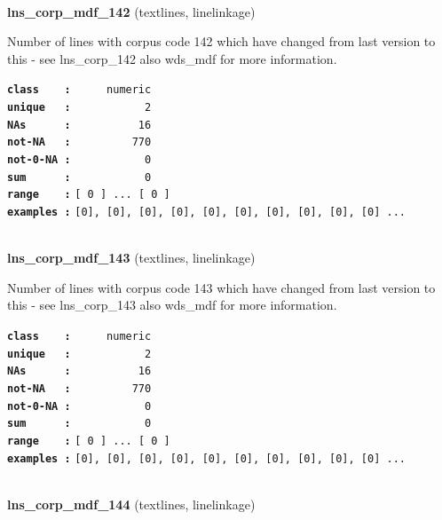 \documentclass[]{article}
\begin{document}
~

\textbf{lns\_corp\_mdf\_142} (textlines, linelinkage)

Number of lines with corpus code 142 which have changed from last
version to this - see lns\_corp\_142 also wds\_mdf for more information.

\textbf{\texttt{class\ \ \ \ :}} \texttt{~~~~~numeric}\\
\textbf{\texttt{unique\ \ \ :}} \texttt{~~~~~~~~~~~2}\\
\textbf{\texttt{NAs\ \ \ \ \ \ :}} \texttt{~~~~~~~~~~16}\\
\textbf{\texttt{not-NA\ \ \ :}} \texttt{~~~~~~~~~770}\\
\textbf{\texttt{not-0-NA\ :}} \texttt{~~~~~~~~~~~0}\\
\textbf{\texttt{sum\ \ \ \ \ \ :}} \texttt{~~~~~~~~~~~0}\\
\textbf{\texttt{range\ \ \ \ :}}
\texttt{{[}\ 0\ {]}\ ...\ {[}\ 0\ {]}}\\
\textbf{\texttt{examples\ :}}
\texttt{{[}0{]},\ {[}0{]},\ {[}0{]},\ {[}0{]},\ {[}0{]},\ {[}0{]},\ {[}0{]},\ {[}0{]},\ {[}0{]},\ {[}0{]}\ ...}\\

~

\textbf{lns\_corp\_mdf\_143} (textlines, linelinkage)

Number of lines with corpus code 143 which have changed from last
version to this - see lns\_corp\_143 also wds\_mdf for more information.

\textbf{\texttt{class\ \ \ \ :}} \texttt{~~~~~numeric}\\
\textbf{\texttt{unique\ \ \ :}} \texttt{~~~~~~~~~~~2}\\
\textbf{\texttt{NAs\ \ \ \ \ \ :}} \texttt{~~~~~~~~~~16}\\
\textbf{\texttt{not-NA\ \ \ :}} \texttt{~~~~~~~~~770}\\
\textbf{\texttt{not-0-NA\ :}} \texttt{~~~~~~~~~~~0}\\
\textbf{\texttt{sum\ \ \ \ \ \ :}} \texttt{~~~~~~~~~~~0}\\
\textbf{\texttt{range\ \ \ \ :}}
\texttt{{[}\ 0\ {]}\ ...\ {[}\ 0\ {]}}\\
\textbf{\texttt{examples\ :}}
\texttt{{[}0{]},\ {[}0{]},\ {[}0{]},\ {[}0{]},\ {[}0{]},\ {[}0{]},\ {[}0{]},\ {[}0{]},\ {[}0{]},\ {[}0{]}\ ...}\\

~

\textbf{lns\_corp\_mdf\_144} (textlines, linelinkage)
\end{document}
